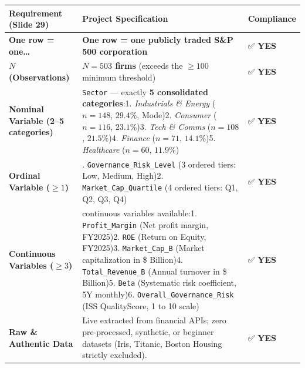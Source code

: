 \documentclass[
]{article}
\newcounter{none} %
\begin{document}
{\def\LTcaptype{none} %
\begin{longtable}[]{@{}
  >{\raggedright\arraybackslash}p{}
  >{\raggedright\arraybackslash}p{}
  >{\centering\arraybackslash}p{}@{}}
\toprule\noalign{}
\begin{minipage}[b]{\linewidth}\raggedright
Requirement (Slide 29)
\end{minipage} & \begin{minipage}[b]{\linewidth}\raggedright
Project Specification
\end{minipage} & \begin{minipage}[b]{\linewidth}\centering
Compliance
\end{minipage} \\
\midrule\noalign{}
\endhead
\bottomrule\noalign{}
\endlastfoot
\textbf{One row = one\ldots{}} & \textbf{One row = one publicly traded
S\&P 500 corporation} & ✅ \textbf{YES} \\
\textbf{\(N\) (Observations)} & \textbf{\(N = 503\) firms} (exceeds the
\(\ge 100\) minimum threshold) & ✅ \textbf{YES} \\
\textbf{Nominal Variable (2--5 categories)} & \texttt{Sector} ---
exactly \textbf{5 consolidated categories}:1. \emph{Industrials \&
Energy} (\(n=148\), \(29.4\%\), Mode)2. \emph{Consumer} (\(n=116\),
\(23.1\%\))3. \emph{Tech \& Comms} (\(n=108\), \(21.5\%\))4.
\emph{Finance} (\(n=71\), \(14.1\%\))5. \emph{Healthcare} (\(n=60\),
\(11.9\%\)) & ✅ \textbf{YES} \\
\textbf{Ordinal Variable (\(\ge 1\))} & 1.
\texttt{Governance\_Risk\_Level} (3 ordered tiers: Low, Medium, High)2.
\texttt{Market\_Cap\_Quartile} (4 ordered tiers: Q1, Q2, Q3, Q4) & ✅
\textbf{YES} \\
\textbf{Continuous Variables (\(\ge 3\))} & 6 continuous variables
available:1. \texttt{Profit\_Margin} (Net profit margin, FY2025)2.
\texttt{ROE} (Return on Equity, FY2025)3. \texttt{Market\_Cap\_B}
(Market capitalization in \$ Billion)4. \texttt{Total\_Revenue\_B}
(Annual turnover in \$ Billion)5. \texttt{Beta} (Systematic risk
coefficient, 5Y monthly)6. \texttt{Overall\_Governance\_Risk} (ISS
QualityScore, 1 to 10 scale) & ✅ \textbf{YES} \\
\textbf{Raw \& Authentic Data} & Live extracted from financial APIs;
zero pre-processed, synthetic, or beginner datasets (Iris, Titanic,
Boston Housing strictly excluded). & ✅ \textbf{YES} \\
\end{longtable}
}
\end{document}
